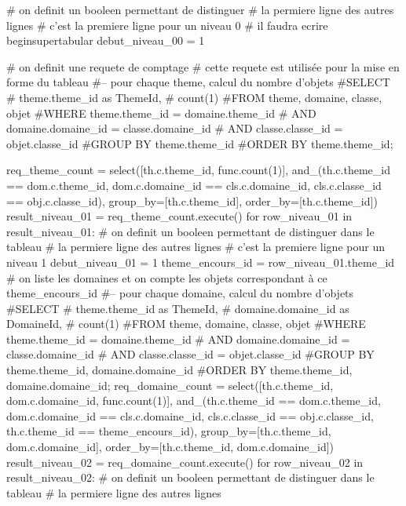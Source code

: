 \documentclass[12pt,titlepage,oneside]{book}
\begin{document}
\begin{lbdpython}

# on definit un booleen permettant de distinguer
# la permiere ligne des autres lignes
# c'est la premiere ligne pour un niveau 0
# il faudra ecrire begin{supertabular}
debut_niveau_00 = 1


# on definit une requete de comptage
# cette requete est utilisée pour la mise en forme du tableau
#-- pour chaque theme, calcul du nombre d'objets
#SELECT
#   theme.theme_id as ThemeId,
#   count(1)
#FROM theme, domaine, classe, objet
#WHERE theme.theme_id = domaine.theme_id 
#  AND domaine.domaine_id = classe.domaine_id
#  AND classe.classe_id = objet.classe_id
#GROUP BY theme.theme_id
#ORDER BY theme.theme_id;

req_theme_count = select([th.c.theme_id, func.count(1)],
                  and_(th.c.theme_id == dom.c.theme_id,
                       dom.c.domaine_id == cls.c.domaine_id,
                       cls.c.classe_id == obj.c.classe_id),
                  group_by=[th.c.theme_id],
                  order_by=[th.c.theme_id])
result_niveau_01 = req_theme_count.execute()
for row_niveau_01 in result_niveau_01:
   # on definit un booleen permettant de distinguer dans le tableau
   # la permiere ligne des autres lignes
   # c'est la premiere ligne pour un niveau 1
   debut_niveau_01 = 1
   theme_encours_id = row_niveau_01.theme_id
   # on liste les domaines et on compte les objets correspondant à ce theme_encours_id
   #-- pour chaque domaine, calcul du nombre d'objets
   #SELECT
   #   theme.theme_id as ThemeId,
   #   domaine.domaine_id as DomaineId,
   #   count(1)
   #FROM theme, domaine, classe, objet
   #WHERE theme.theme_id = domaine.theme_id
   #  AND domaine.domaine_id = classe.domaine_id
   #  AND classe.classe_id = objet.classe_id
   #GROUP BY theme.theme_id, domaine.domaine_id
   #ORDER BY theme.theme_id, domaine.domaine_id;
   req_domaine_count = select([th.c.theme_id, dom.c.domaine_id, func.count(1)],
                       and_(th.c.theme_id == dom.c.theme_id,
                            dom.c.domaine_id == cls.c.domaine_id,
                            cls.c.classe_id == obj.c.classe_id,
                            th.c.theme_id == theme_encours_id),
                       group_by=[th.c.theme_id, dom.c.domaine_id],
                       order_by=[th.c.theme_id, dom.c.domaine_id])
   result_niveau_02 = req_domaine_count.execute()
   for row_niveau_02 in result_niveau_02:
      # on definit un booleen permettant de distinguer dans le tableau
      # la permiere ligne des autres lignes

\end{lbdpython}
\end{document}
